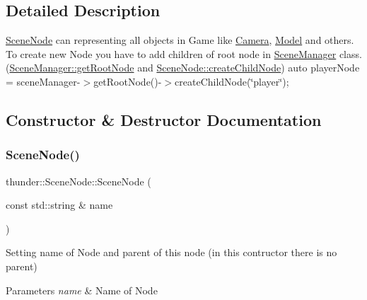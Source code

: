 \subsection{Detailed Description}
\mbox{\hyperlink{classthunder_1_1_scene_node}{Scene\+Node}} can representing all objects in Game like \mbox{\hyperlink{classthunder_1_1_camera}{Camera}}, \mbox{\hyperlink{classthunder_1_1_model}{Model}} and others. To create new Node you have to add children of root node in \mbox{\hyperlink{classthunder_1_1_scene_manager}{Scene\+Manager}} class. (\mbox{\hyperlink{classthunder_1_1_scene_manager_a3cc5d2cbec1cb527ef71895c1ced1081}{Scene\+Manager\+::get\+Root\+Node}} and \mbox{\hyperlink{classthunder_1_1_scene_node_abf763f599246d735a8a7f14992366d80}{Scene\+Node\+::create\+Child\+Node}}) {\ttfamily auto player\+Node = scene\+Manager-\/$>$get\+Root\+Node()-\/$>$create\+Child\+Node(\char`\"{}player\char`\"{});} 

\subsection{Constructor \& Destructor Documentation}
\mbox{\label{classthunder_1_1_scene_node_a78be890be6717725fa46c5cad58e7f44}} 
\subsubsection{\texorpdfstring{Scene\+Node()}{SceneNode()}\hspace{0.1cm}{\footnotesize\ttfamily [1/2]}}
{\footnotesize\ttfamily thunder\+::\+Scene\+Node\+::\+Scene\+Node (\begin{DoxyParamCaption}\item[{const std\+::string \&}]{name }\end{DoxyParamCaption})}

Setting name of Node and parent of this node (in this contructor there is no parent)


\begin{DoxyParams}{Parameters}
{\em name} & Name of Node \\
\hline
\end{DoxyParams}
\mbox{\label{classthunder_1_1_scene_node_ab9beda2e6774d2d209364c891acebc1f}} 
